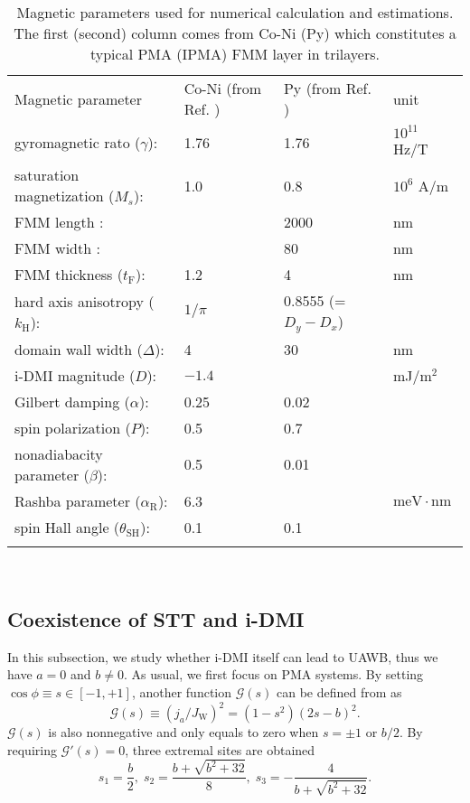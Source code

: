 \documentclass[12pt]{iopart}
\begin{document}
\begin{table}
	\caption{\label{table1}Magnetic parameters used for numerical calculation and estimations. The first (second) column 
		comes from Co-Ni (Py) which constitutes a typical PMA (IPMA) FMM layer in trilayers.}
	\footnotesize
	\begin{tabular}{@{}llll}
		\br
		Magnetic parameter & Co-Ni (from Ref. \cite{Risinggad_PRB_2017}) & Py (from Ref. \cite{Seo_APL_2012}) & unit  \\
		\mr
		gyromagnetic rato ($\gamma$): & 1.76 & 1.76 & $10^{11}$ Hz/T \\
		saturation magnetization ($M_s$): & 1.0 & 0.8 & $10^6$ A/m \\
		FMM length : &   & 2000 & nm\\
		FMM width : &   & 80 & nm\\
		FMM thickness ($t_{\mathrm{F}}$): & 1.2 & 4 & nm\\
		hard axis anisotropy ($k_{\mathrm{H}}$): & $1/\pi$ & 0.8555 (=$D_y-D_x$) &   \\
		domain wall width ($\Delta$): & 4 & 30 & nm\\
		i-DMI magnitude ($D$): & $-1.4$ &   &  mJ/$\mathrm{m^2}$ \\
		Gilbert damping ($\alpha$): & 0.25 & 0.02 &     \\
		spin polarization ($P$): & 0.5 & 0.7 &  \\
		nonadiabacity parameter ($\beta$): & 0.5 & 0.01 &  \\
		Rashba parameter ($\alpha_{\mathrm{R}}$): & 6.3 &  &  $\mathrm{meV\cdot nm}$ \\
		spin Hall angle ($\theta_{\mathrm{SH}}$): & 0.1 & 0.1 &  \\
		
		\br
	\end{tabular}\\
	
\end{table}
\normalsize


\subsection{Coexistence of STT and i-DMI}\label{WalkerBreakdownSuppression:OnlyDMI}
In this subsection, we study whether i-DMI itself can lead to 
UAWB, thus we have $a=0$ and $b\ne 0$.
As usual, we first focus on PMA systems.
By setting $\cos\phi\equiv s\in[-1,+1]$,
another function $\mathcal{G}(s)$ can be defined from  as
\begin{equation}\label{G_s_only_FL_SOTs}
\mathcal{G}(s)\equiv\left(j_a/J_{\mathrm{W}}\right)^2 = (1-s^2)(2s-b)^2.
\end{equation}
$\mathcal{G}(s)$ is also nonnegative and only equals to zero when
$s=\pm1$ or $b/2$.
By requiring $\mathcal{G}'(s)=0$, three extremal sites are obtained
\begin{equation}\label{dG_ds_3roots_only_FL_SOTs}
s_1=\frac{b}{2},\; s_2=\frac{b+\sqrt{b^2+32}}{8},\; s_3=-\frac{4}{b+\sqrt{b^2+32}}.
\end{equation}
\end{document}
